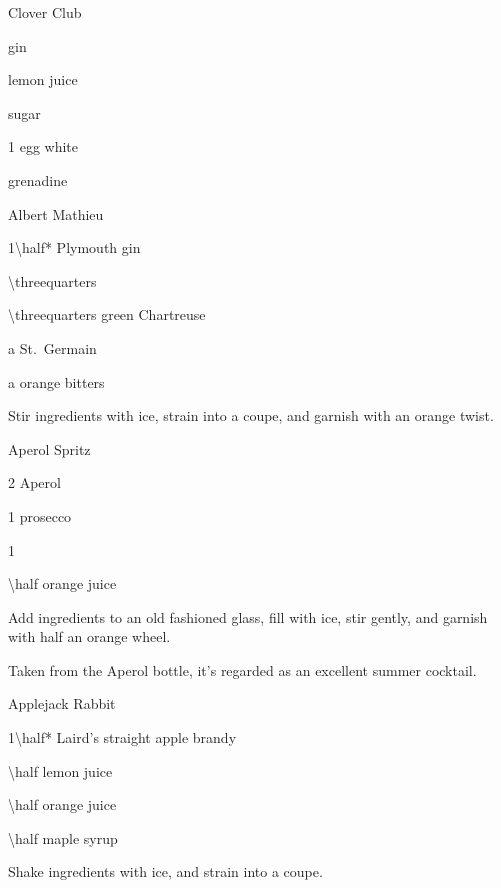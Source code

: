 \begin{CCCocktail}{Clover Club}
	\begin{Ingredients}
	\item gin
	\item lemon juice
	\item sugar
	\item 1 egg white
	\item grenadine
	\end{Ingredients}
\end{CCCocktail}
\begin{PDTCocktail}{Albert Mathieu} %
	\begin{Ingredients}
	\item \SI{1\half*}{\oz} Plymouth gin
	\item \SI{\threequarters}{\oz} \Lillet
	\item \SI{\threequarters}{\oz} green Chartreuse
	\item a \si{\dash} St.\ Germain
	\item a \si{\dash} orange bitters
	\end{Ingredients}
	
	\begin{Instructions}
	Stir ingredients with ice, strain into a coupe, and garnish with an orange twist.
	\end{Instructions}
\end{PDTCocktail}

\begin{PDTCocktail}{Aperol Spritz}
	\begin{Ingredients}
	\item \SI{2}{\oz} Aperol
	\item \SI{1}{\oz} prosecco
	\item \SI{1}{\oz} \soda\/
	\item \SI{\half}{\oz} orange juice
	\end{Ingredients}
	
	\begin{Instructions}
	Add ingredients to an old fashioned glass, fill with ice, stir gently, and garnish with half an orange wheel.
	
	Taken from the Aperol bottle, it's regarded as an excellent summer cocktail.
	\end{Instructions}
\end{PDTCocktail}

\begin{PDTCocktail}{Applejack Rabbit}
	\begin{Ingredients}
	\item \SI{1\half*}{\oz} Laird's straight apple brandy
	\item \SI{\half}{\oz} lemon juice
	\item \SI{\half}{\oz} orange juice
	\item \SI{\half}{\oz} maple syrup
	\end{Ingredients}
	
	\begin{Instructions}
	Shake ingredients with ice, and strain into a coupe.
	\end{Instructions}
\end{PDTCocktail}

